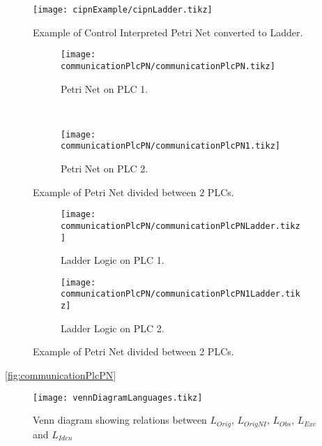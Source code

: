 % 
% 
\usetikzlibrary{arrows,shapes,circuits.plc.ladder,external}

\begin{figure}[H]
  \centering
  \texttt{[image: cipnExample/cipnLadder.tikz]}
  \caption[cipnexample]{Example of Control Interpreted Petri Net converted to Ladder.}
  \label{fig:cipnexampleLadder}
\end{figure}

\begin{figure}[H]
    \centering
    \begin{subfigure}[t]{0.5\textwidth}
        \centering
        \texttt{[image: communicationPlcPN/communicationPlcPN.tikz]}
        \caption{Petri Net on PLC 1.}
        \label{fig:communicationPlcPN}
    \end{subfigure}%
    ~ 
    \begin{subfigure}[t]{0.5\textwidth}
        \centering
  \texttt{[image: communicationPlcPN/communicationPlcPN1.tikz]}
  \caption{Petri Net on PLC 2.}
  \label{fig:communicationPlcPN1}
    \end{subfigure}
    \caption{Example of Petri Net divided between 2 PLCs.}
\end{figure}


\begin{figure}[H]
    \centering
    \begin{subfigure}[t]{0.45\textwidth}
        \centering
        \texttt{[image: communicationPlcPN/communicationPlcPNLadder.tikz]}
        \caption{Ladder Logic on PLC 1.}
        \label{fig:communicationPlcPN}
    \end{subfigure}%
\hfill
    \begin{subfigure}[t]{0.45\textwidth}
        \centering
        \texttt{[image: communicationPlcPN/communicationPlcPN1Ladder.tikz]}
  \caption{Ladder Logic on PLC 2.}
  \label{fig:communicationPlcPN1}
    \end{subfigure}
    \caption{Example of Petri Net divided between 2 PLCs.}
\end{figure}
  

\autoref{fig:communicationPlcPN}






\usetikzlibrary{patterns}
\begin{figure}[H]
  \centering
  \texttt{[image: vennDiagramLanguages.tikz]}
  \caption{Venn diagram showing relations between $L_{Orig}$, $L_{OrigNI}$,
    $L_{Obs}$, $L_{Exc}$ and $L_{Iden}$}
\end{figure}


